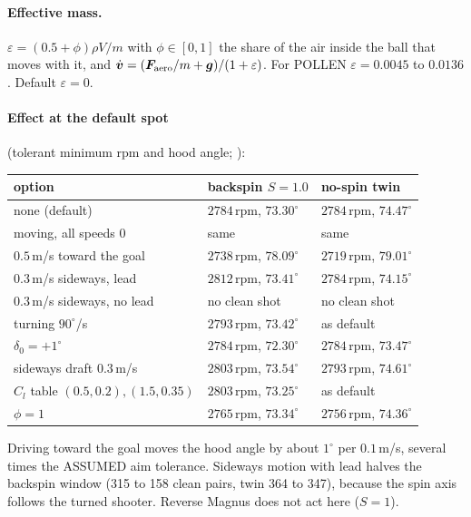 \paragraph{Effective mass.} $\varepsilon=(0.5+\phi)\rho V/m$ with $\phi\in[0,1]$\assumed{} the share of the
air inside the ball that moves with it, and
$\dot{\bm{v}}=(\bm{F}_{\text{aero}}/m+\bm{g})/(1+\varepsilon)$. For POLLEN
$\varepsilon=0.0045$ to $0.0136$\derived. Default $\varepsilon=0$.

\paragraph{Effect at the default spot} (tolerant minimum rpm and hood angle; \predicted):
\begin{center}
\begin{tabular}{@{}lll@{}}
  \toprule
  option & backspin $S=1.0$ & no-spin twin \\
  \midrule
  none (default) & $2784$\,rpm, $73.30^\circ$ & $2784$\,rpm, $74.47^\circ$ \\
  moving, all speeds $0$ & same & same \\
  $0.5$\,m/s toward the goal & $2738$\,rpm, $78.09^\circ$ & $2719$\,rpm, $79.01^\circ$ \\
  $0.3$\,m/s sideways, lead & $2812$\,rpm, $73.41^\circ$ & $2784$\,rpm, $74.15^\circ$ \\
  $0.3$\,m/s sideways, no lead & no clean shot & no clean shot \\
  turning $90^\circ$/s & $2793$\,rpm, $73.42^\circ$ & as default \\
  $\delta_0=+1^\circ$ & $2784$\,rpm, $72.30^\circ$ & $2784$\,rpm, $73.47^\circ$ \\
  sideways draft $0.3$\,m/s & $2803$\,rpm, $73.54^\circ$ & $2793$\,rpm, $74.61^\circ$ \\
  $C_l$ table $(0.5,0.2),(1.5,0.35)$ & $2803$\,rpm, $73.25^\circ$ & as default \\
  $\phi=1$ & $2765$\,rpm, $73.34^\circ$ & $2756$\,rpm, $74.36^\circ$ \\
  \bottomrule
\end{tabular}
\end{center}
Driving toward the goal moves the hood angle by about $1^\circ$ per $0.1$\,m/s\predicted, several times the
ASSUMED aim tolerance. Sideways motion with lead halves the backspin window (315 to 158 clean pairs, twin 364
to 347), because the spin axis follows the turned shooter. Reverse Magnus does not act here ($S=1$).

